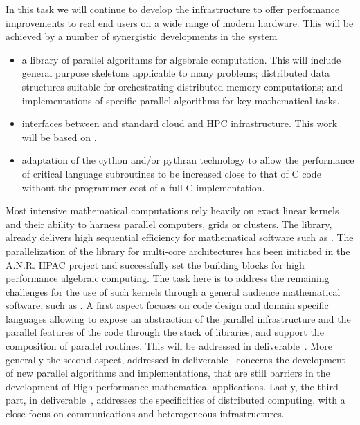 \begin{workpackage}
\begin{tasklist}
\begin{task}[title=GAP,id=hpc-gap,PM=18, lead=SA]
In this task we will continue to develop the \GAP infrastructure to
offer performance improvements to real end users on a wide range of
modern hardware. This will be achieved by a number of synergistic
developments in the system

\begin{itemize}
\item a library of parallel algorithms for algebraic computation. This
  will include general purpose skeletons applicable to many problems;
  distributed data structures suitable for orchestrating distributed
  memory computations; and implementations of specific parallel algorithms for key
  mathematical tasks.  
\item interfaces between \GAP and standard cloud and HPC
  infrastructure. This work will be based on .
\item adaptation of the cython and/or pythran technology to allow the
  performance of critical \GAP language subroutines to be increased
  close to that of C code without the programmer cost of a full C implementation.
\end{itemize}
\end{task}

\begin{task}[title=Linbox,PM=34,id=hpc-linbox, lead=UJF,wphases={3-12!0.3,12-36,36-48!0.3}]
Most intensive mathematical computations rely heavily on exact linear kernels
and their ability to harness parallel computers, grids or clusters. The \Linbox
library, already delivers high sequential efficiency for mathematical software
such as \Sage. The parallelization of the library for multi-core architectures
has been initiated in the A.N.R. HPAC project and successfully set the building
blocks for high performance algebraic computing. 
The task here is to  address the remaining challenges for the use of such
kernels through a general audience mathematical software, such as \Sage.
A first aspect focuses on code design and domain specific languages allowing to
expose an abstraction of the parallel infrastructure and the parallel features
of the code through the stack of libraries, and support the
composition of parallel routines. This will be addressed in
deliverable~. More generally the second aspect, addressed
in deliverable~ concerns the 
development of new parallel algorithms and implementations, that are still
barriers in the development of High performance mathematical
applications. Lastly, the third part, in
deliverable~, addresses the specificities of  distributed
computing, with a close focus on communications and heterogeneous infrastructures.


\end{task}
\end{tasklist}
\end{workpackage}
